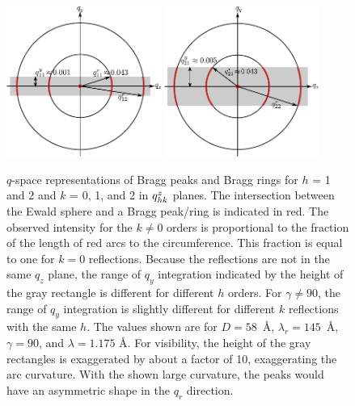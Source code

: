 \begin{figure}[htbp]
  \centering
  \includegraphics[width=0.45\textwidth]{figures/ripple/analysis/ewald_side_h1_ver1}
  \includegraphics[width=0.45\textwidth]{figures/ripple/analysis/ewald_side_h2_ver1}
  \caption{$q$-space representations of Bragg peaks and Bragg rings 
  for $h$ = 1 and 2 and $k$ = 0, 1, and 2 in $q_{hk}^z$ planes.
  The intersection between the Ewald sphere and 
  a Bragg peak/ring is indicated in red. 
  The observed intensity for the $k\neq 0$ orders is proportional to
  the fraction of the length of red arcs to the circumference. This 
  fraction is equal to one for $k=0$ reflections.
  Because the reflections are not in the same $q_z$ plane, the range of $q_y$ 
  integration indicated by the height of the gray rectangle is different for different
  $h$ orders. For $\gamma\neq 90$\textdegree, the range of $q_y$ integration is
  slightly different for different $k$ reflections with the same $h$. 
  The values shown are for $D=58$~\AA, $\lambda_r=145$~\AA, $\gamma=90$\textdegree,
  and $\lambda=1.175$ \AA. For visibility, the height of the gray rectangles 
  is exaggerated by about a factor of 10, exaggerating the arc curvature.  
  With the shown large curvature, the peaks would have an asymmetric 
  shape in the $q_r$ direction.}
  \label{fig:ewald_side}
\end{figure}

